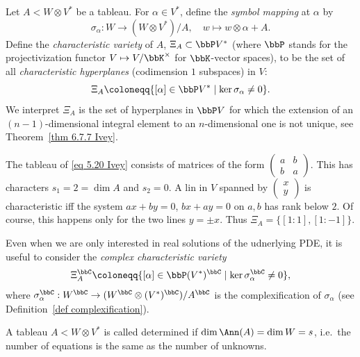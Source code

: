 \begin{defn}\label{def symbol map}
    Let $A<W\otimes V^\ast$ be a tableau. For $\alpha\in V^\ast$, define the \emph{symbol mapping} at $\alpha$ by 
    \[\sigma_\alpha:W\to (W\otimes V^\ast)\slash A,\quad w\mapsto w\otimes\alpha + A.\]
    Define the \emph{characteristic variety} of $A$, $\Xi_A\subset \bbP V^\ast$ (where $\bbP$ stands for the projectivization functor $V\mapsto V\slash \bbK^\times$ for $\bbK$-vector spaces), to be the set of all \emph{characteristic hyperplanes} (codimension $1$ subspaces) in $V$:
    \[\Xi_A\coloneqq \{[\alpha]\in \bbP V^\ast\mid \ker \sigma_\alpha\neq 0\}.\]
    We interpret $\Xi_A$ is the set of hyperplanes in $\bbP V$ for which the extension of an $(n-1)$-dimensional integral element to an $n$-dimensional one is not unique, see Theorem~\ref{thm 6.7.7 Ivey}.
\end{defn}

\begin{example}
    The tableau of \ref{eq 5.20 Ivey} consists of matrices of the form $\left(\begin{smallmatrix}
        a&b\\b&a
    \end{smallmatrix}\right)$. This has characters $s_1=2=\dim A$ and $s_2=0$. A lin in $V$ spanned by $\left(\begin{smallmatrix}
        x\\ y
    \end{smallmatrix}\right)$ is characteristic iff the system $ax+by=0$, $bx+ay=0$ on $a,b$ has rank below $2$. Of course, this happens only for the two lines $y=\pm x$. Thus $\Xi_A=\{[1:1],[1:-1]\}$. 
\end{example}

Even when we are only interested in real solutions of the udnerlying PDE, it is useful to consider the \emph{complex characteristic variety}
\[\Xi^\bbC_A\coloneqq \{[\alpha]\in \bbP (V^\ast)^\bbC\mid \ker \sigma_\alpha^\bbC\neq 0\},\]
where $\sigma^\bbC_\alpha:W^\bbC\to (W^\bbC\otimes (V^\ast)^\bbC)\slash A^\bbC$ is the complexification of $\sigma_\alpha$ (see Definition~\ref{def complexification}).

\begin{defn}
    A tableau $A<W\otimes V^\ast$ is called determined if $\dim \Ann(A)=\dim W=s$, i.e.\ the number of equations is the same as the number of unknowns.
\end{defn}

